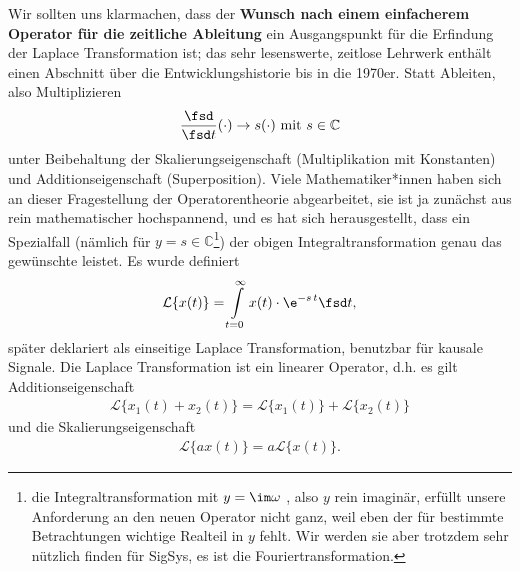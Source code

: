 Wir sollten uns klarmachen, dass der \textbf{Wunsch nach einem einfacherem Operator
für die zeitliche Ableitung} ein Ausgangspunkt für die Erfindung der Laplace
Transformation ist; das sehr lesenswerte, zeitlose Lehrwerk \cite{LangeSigSys1} enthält
einen Abschnitt über die Entwicklungshistorie bis in die 1970er.
Statt Ableiten, also Multiplizieren
\begin{equation}
  \frac{\fsd }{\fsd t} (\cdot) \rightarrow s(\cdot ) \text{ mit } s \in \mathbb{C}
\end{equation}
unter Beibehaltung der Skalierungseigenschaft (Multiplikation mit Konstanten)
und Additionseigenschaft (Superposition).
%
Viele Mathematiker*innen haben sich an dieser Fragestellung der Operatorentheorie
abgearbeitet, sie ist ja zunächst aus rein mathematischer hochspannend, und
es hat sich herausgestellt, dass ein Spezialfall
(nämlich für $y=s\in\mathbb{C}$\footnote{die Integraltransformation mit $y=\im\omega$
, also $y$ rein imaginär, erfüllt unsere Anforderung an den neuen Operator nicht ganz,
weil eben der für bestimmte Betrachtungen wichtige Realteil in $y$ fehlt.
Wir werden sie aber trotzdem sehr nützlich finden
für SigSys, es ist die Fouriertransformation.})
der obigen
Integraltransformation genau das gewünschte leistet. Es wurde definiert
\begin{align}
\mathcal{L}\{x(t)\} = \int\limits_{t=0}^{\infty} x(t) \cdot \e^{-s\,t} \fsd t,
\end{align}
später deklariert als einseitige Laplace Transformation, benutzbar
für kausale Signale.
%
Die Laplace Transformation ist ein linearer Operator, d.h.
es gilt Additionseigenschaft
\begin{align}
\mathcal{L}\{x_1(t)+x_2(t)\} = \mathcal{L}\{x_1(t)\} + \mathcal{L}\{x_2(t)\}
\end{align}
und die Skalierungseigenschaft
\begin{align}
\mathcal{L}\{a x(t)\} = a \mathcal{L}\{x(t)\}.
\end{align}

